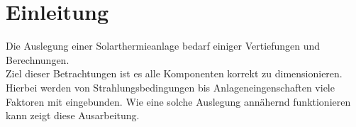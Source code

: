 \section{Einleitung}
\label{sec:Einleitung}
Die Auslegung einer Solarthermieanlage bedarf einiger Vertiefungen und Berechnungen.\\
Ziel dieser Betrachtungen ist es alle Komponenten korrekt zu dimensionieren.
Hierbei werden von Strahlungsbedingungen bis Anlageneingenschaften viele Faktoren mit eingebunden.
Wie eine solche Auslegung annähernd funktionieren kann zeigt diese Ausarbeitung.\\

